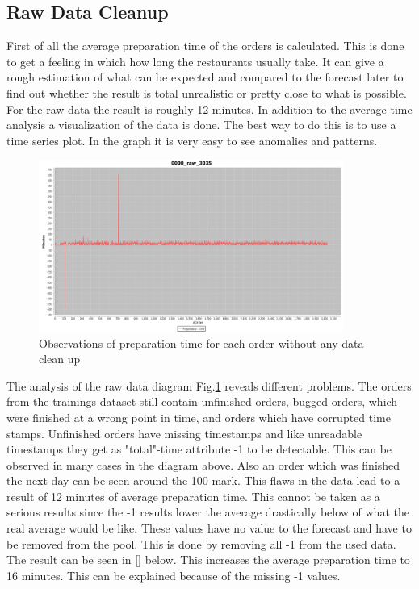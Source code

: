 \subsection{Raw Data Cleanup}\label{subsection:Raw Data Cleanup}
First of all the average preparation time of the orders is calculated. This is done to get a feeling in which how long the restaurants usually take. It can give a rough estimation of what can be expected and compared to the forecast later to find out whether the result is total unrealistic or pretty close to what is possible. For the raw data the result is roughly 12 minutes.\newline
In addition to the average time analysis a visualization of the data is done. The best way to do this is to use a time series plot. In the graph it is very easy to see anomalies and patterns.

\begin{figure}[h]
\begin{center}
\includegraphics[width=10cm]{images/0000_raw_3035.png}
\caption{Observations of preparation time for each order without any data clean up}
\label{fig:0000_raw_3035.png}
\end{center}
\end{figure}

The analysis of the raw data diagram Fig.\ref{fig:0000_raw_3035.png} reveals different problems. The orders from the trainings dataset still contain unfinished orders, bugged orders, which were finished at a wrong point in time, and orders which have corrupted time stamps. Unfinished orders have missing timestamps and like unreadable timestamps they get as "total"-time attribute -1 to be detectable. This can be observed in many cases in the diagram above. Also an order which was finished the next day can be seen around the 100 mark. This flaws in the data lead to a result of 12 minutes of average preparation time. This cannot be taken as a serious results since the -1 results lower the average drastically below of what the real average would be like. These values have no value to the forecast and have to be removed from the pool. This is done by removing all -1 from the used data. The result can be seen in [] below. This increases the average preparation time to 16 minutes. This can be explained because of the missing -1 values.

